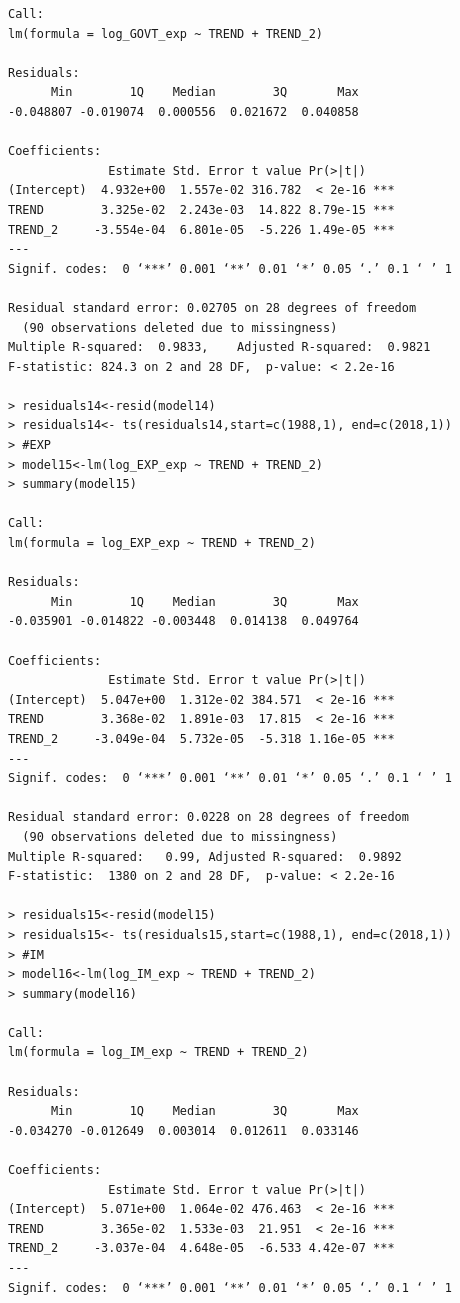 \documentclass[12pt]{article}
\begin{document}
\begin{verbatim}
Call:
lm(formula = log_GOVT_exp ~ TREND + TREND_2)

Residuals:
      Min        1Q    Median        3Q       Max 
-0.048807 -0.019074  0.000556  0.021672  0.040858 

Coefficients:
              Estimate Std. Error t value Pr(>|t|)    
(Intercept)  4.932e+00  1.557e-02 316.782  < 2e-16 ***
TREND        3.325e-02  2.243e-03  14.822 8.79e-15 ***
TREND_2     -3.554e-04  6.801e-05  -5.226 1.49e-05 ***
---
Signif. codes:  0 ‘***’ 0.001 ‘**’ 0.01 ‘*’ 0.05 ‘.’ 0.1 ‘ ’ 1

Residual standard error: 0.02705 on 28 degrees of freedom
  (90 observations deleted due to missingness)
Multiple R-squared:  0.9833,	Adjusted R-squared:  0.9821 
F-statistic: 824.3 on 2 and 28 DF,  p-value: < 2.2e-16

> residuals14<-resid(model14)
> residuals14<- ts(residuals14,start=c(1988,1), end=c(2018,1))
> #EXP
> model15<-lm(log_EXP_exp ~ TREND + TREND_2)
> summary(model15)

Call:
lm(formula = log_EXP_exp ~ TREND + TREND_2)

Residuals:
      Min        1Q    Median        3Q       Max 
-0.035901 -0.014822 -0.003448  0.014138  0.049764 

Coefficients:
              Estimate Std. Error t value Pr(>|t|)    
(Intercept)  5.047e+00  1.312e-02 384.571  < 2e-16 ***
TREND        3.368e-02  1.891e-03  17.815  < 2e-16 ***
TREND_2     -3.049e-04  5.732e-05  -5.318 1.16e-05 ***
---
Signif. codes:  0 ‘***’ 0.001 ‘**’ 0.01 ‘*’ 0.05 ‘.’ 0.1 ‘ ’ 1

Residual standard error: 0.0228 on 28 degrees of freedom
  (90 observations deleted due to missingness)
Multiple R-squared:   0.99,	Adjusted R-squared:  0.9892 
F-statistic:  1380 on 2 and 28 DF,  p-value: < 2.2e-16

> residuals15<-resid(model15)
> residuals15<- ts(residuals15,start=c(1988,1), end=c(2018,1))
> #IM
> model16<-lm(log_IM_exp ~ TREND + TREND_2)
> summary(model16)

Call:
lm(formula = log_IM_exp ~ TREND + TREND_2)

Residuals:
      Min        1Q    Median        3Q       Max 
-0.034270 -0.012649  0.003014  0.012611  0.033146 

Coefficients:
              Estimate Std. Error t value Pr(>|t|)    
(Intercept)  5.071e+00  1.064e-02 476.463  < 2e-16 ***
TREND        3.365e-02  1.533e-03  21.951  < 2e-16 ***
TREND_2     -3.037e-04  4.648e-05  -6.533 4.42e-07 ***
---
Signif. codes:  0 ‘***’ 0.001 ‘**’ 0.01 ‘*’ 0.05 ‘.’ 0.1 ‘ ’ 1


\end{verbatim}
\end{document}
